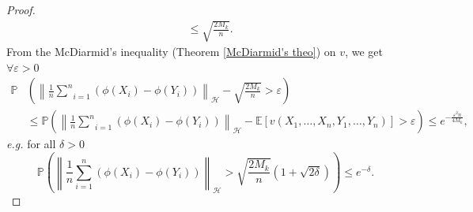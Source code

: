\documentclass[twoside,11pt]{article}
\newcommand{\Hk}{\mathcal{H}}
\newcommand{\nb}{n}
\newcommand{\PPO}{\mathbb{P} }
\newcommand{\EE}{\mathbb{E}}%
\newcommand{\ti}[1]{\textit{#1}} %
\begin{document}
\begin{proof}
\begin{align*}
    &\leq \sqrt{\frac{2 M_k}{\nb}}.
    \label{temp_proof}
\end{align*}
From the McDiarmid's inequality (Theorem \ref{McDiarmid's theo}) on $v$, we get $\forall \varepsilon>0$ 
\begin{align*}
    \PPO &\left(  \left\| \frac{1}{\nb} \underset{i=1}{\overset{\nb}{\sum}} \left(\phi(X_i) - \phi(Y_i)\right) \right\|_{\Hk} - \sqrt{\frac{2 M_k}{\nb}} > \varepsilon  \right) \\
    &\leq \PPO \left(  \left\| \frac{1}{\nb} \underset{i=1}{\overset{\nb}{\sum}} \left(\phi(X_i) - \phi(Y_i)\right) \right\|_{\Hk} - \EE[v\left(X_1,\ldots,X_{\nb},Y_1,\ldots,Y_{\nb}\right)]  > \varepsilon  \right) \leq e^{-\frac{\varepsilon^2 \nb}{4 M_k}},
\end{align*}
\ti{e.g.} for all $\delta >0$ 
\begin{equation*}
    \PPO \left(  \left\| \frac{1}{\nb} \underset{i=1}{\overset{\nb}{\sum}} \left(\phi(X_i) - \phi(Y_i)\right) \right\|_{\Hk} > \sqrt{\frac{2 M_k}{\nb}} \left(1+\sqrt{2\delta}\right) \right) \leq e^{-\delta}.
\end{equation*}
\end{proof}
\end{document}
